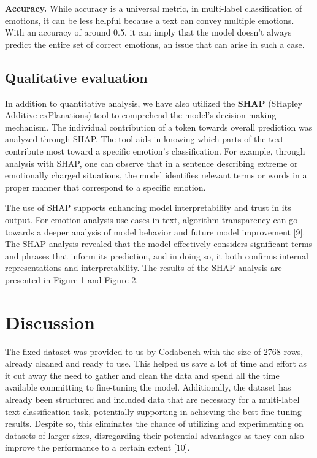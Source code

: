 \documentclass[11pt]{article}
\begin{document}
\textbf{Accuracy.} While accuracy is a universal metric, in multi-label classification of emotions, it can be less helpful because a text can convey multiple emotions. With an accuracy of around 0.5, it can imply that the model doesn't always predict the entire set of correct emotions, an issue that can arise in such a case.
\subsection{Qualitative evaluation}
In addition to quantitative analysis, we have also utilized the \textbf{SHAP} (SHapley Additive exPlanations) tool to comprehend the model’s decision-making mechanism. The individual contribution of a token towards overall prediction was analyzed through SHAP. The tool aids in knowing which parts of the text contribute most toward a specific emotion's classification. For example, through analysis with SHAP, one can observe that in a sentence describing extreme or emotionally charged situations, the model identifies relevant terms or words in a proper manner that correspond to a specific emotion.

The use of SHAP supports enhancing model interpretability and trust in its output. For emotion analysis use cases in text, algorithm transparency can go towards a deeper analysis of model behavior and future model improvement [9]. The SHAP analysis revealed that the model effectively considers significant terms and phrases that inform its prediction, and in doing so, it both confirms internal representations and interpretability. The results of the SHAP analysis are presented in Figure 1 and Figure 2.

\section{Discussion}
The fixed dataset was provided to us by Codabench with the size of 2768 rows, already cleaned and ready to use. This helped us save a lot of time and effort as it cut away the need to gather and clean the data and spend all the time available committing to fine-tuning the model. Additionally, the dataset has already been structured and included data that are necessary for a multi-label text classification task, potentially supporting in achieving the best fine-tuning results. Despite so, this eliminates the chance of utilizing and experimenting on datasets of larger sizes, disregarding their potential advantages as they can also improve the performance to a certain extent [10].
\end{document}
